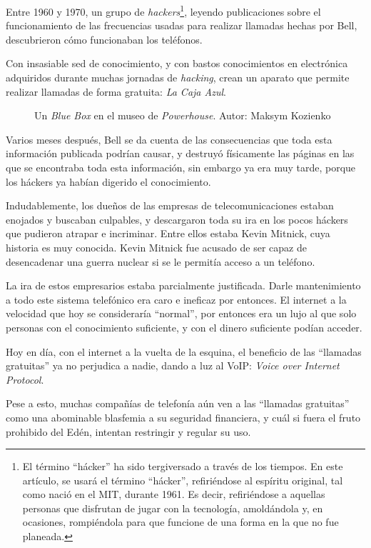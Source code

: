 Entre 1960 y 1970, un grupo de \textit{hackers}\footnote{El término ``hácker'' ha sido tergiversado a través de los tiempos. En este artículo, se usará el término ``hácker'', refiriéndose al espíritu original, tal como nació en el MIT, durante 1961. Es decir, refiriéndose a aquellas personas que disfrutan de jugar con la tecnología, amoldándola y, en ocasiones, rompiéndola para que funcione de una forma en la que no fue planeada.}, leyendo publicaciones sobre el funcionamiento de las frecuencias usadas para realizar llamadas hechas por Bell, descubrieron cómo funcionaban los teléfonos. \cite{bluebox:sarts}

Con insasiable sed de conocimiento, y con bastos conocimientos en electrónica adquiridos durante muchas jornadas de \textit{hacking}, crean un aparato que permite realizar llamadas de forma gratuita: \textit{La Caja Azul}.

\begin{figure}
\centering
{}
\caption{Un \textit{Blue Box} en el museo de \textit{Powerhouse}.
Autor: Maksym Kozienko}
\end{figure}

Varios meses después, Bell se da cuenta de las consecuencias que toda esta información publicada podrían causar, y destruyó físicamente las páginas en las que se encontraba toda esta información, sin embargo ya era muy tarde, porque los háckers ya habían digerido el conocimiento.

Indudablemente, los dueños de las empresas de telecomunicaciones estaban enojados y buscaban culpables, y descargaron toda su ira en los pocos háckers que pudieron atrapar e incriminar. Entre ellos estaba Kevin Mitnick, cuya historia es muy conocida. Kevin Mitnick fue acusado de ser capaz de desencadenar una guerra nuclear si se le permitía acceso a un teléfono.

La ira de estos empresarios estaba parcialmente justificada. Darle mantenimiento a todo este sistema telefónico era caro e ineficaz por entonces. El internet a la velocidad que hoy se consideraría ``normal'', por entonces era un lujo al que solo personas con el conocimiento suficiente, y con el dinero suficiente podían acceder.\cite{bluebox:documentary}

Hoy en día, con el internet a la vuelta de la esquina, el beneficio de las ``llamadas gratuitas'' ya no perjudica a nadie, dando a luz al VoIP: \textit{Voice over Internet Protocol}.

Pese a esto, muchas compañías de telefonía aún ven a las ``llamadas gratuitas'' como una abominable blasfemia a su seguridad financiera, y cuál si fuera el fruto prohibido del Edén, intentan restringir y regular su uso.
